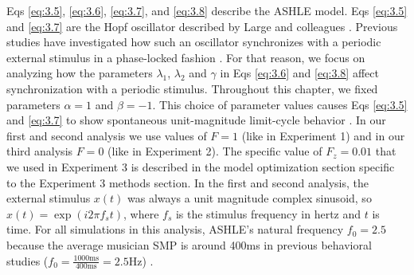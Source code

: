 \documentclass{report}
\begin{document}
Eqs \eqref{eq:3.5}, \eqref{eq:3.6}, \eqref{eq:3.7}, and \eqref{eq:3.8} describe the ASHLE model. Eqs \eqref{eq:3.5} and \eqref{eq:3.7} are the Hopf oscillator described by Large and colleagues \cite{large2010canonical}. Previous studies have investigated how such an oscillator synchronizes with a periodic external stimulus in a phase-locked fashion \cite{kim2015signal}. For that reason, we focus on analyzing how the parameters $\lambda_1$, $\lambda_2$ and $\gamma$ in Eqs \eqref{eq:3.6} and \eqref{eq:3.8} affect synchronization with a periodic stimulus. Throughout this chapter, we fixed parameters $\alpha=1$ and $\beta=-1$. This choice of parameter values causes Eqs \eqref{eq:3.5} and \eqref{eq:3.7} to show spontaneous unit-magnitude limit-cycle behavior \cite{kim2015signal}. In our first and second analysis we use values of $F = 1$ (like in Experiment 1) and in our third analysis $F = 0$ (like in Experiment 2). The specific value of $F_z = 0.01$ that we used in Experiment 3 is described in the model optimization section specific to the Experiment 3 methods section. In the first and second analysis, the external stimulus $x(t)$ was always a unit magnitude complex sinusoid, so $x(t) = \exp(i2\pi f_s t)$, where $f_s$ is the stimulus frequency in hertz and $t$ is time. For all simulations in this analysis, ASHLE's natural frequency $f_0 = 2.5$ because the average musician SMP is around 400ms in previous behavioral studies ($f_0 = \frac{1000\text{ms}}{400\text{ms}}=2.5\text{Hz}$) \cite{scheurich2018tapping, zamm2018musicians, zamm2016endogenous}.
\end{document}
